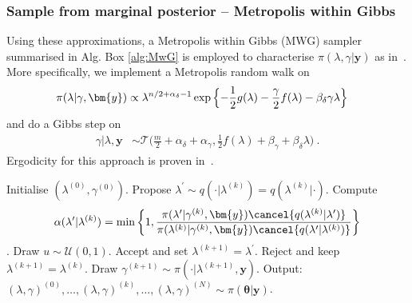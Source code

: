 \subsubsection{Sample from marginal posterior -- Metropolis within Gibbs}
\label{subsec:MWG}
Using these approximations, a Metropolis within Gibbs (MWG) sampler summarised in Alg. Box \ref{alg:MwG} is employed to characterise $\pi(\lambda,\gamma|\bm{y})$ as in~\cite{fox2016fast}.
More specifically, we implement a Metropolis random walk on
\begin{align}
	\label{eq:margApplCondGam}
	\pi(\lambda | \gamma, \bm{y}) &\propto \lambda^{n/2 +\alpha_{\delta}-1} \exp{\Bigl\{ - \frac{1}{2} g ( \lambda) - \frac{\gamma}{2} f ( \lambda) - \beta_\delta \gamma \lambda \Bigr\}}
\end{align} 
and do a Gibbs step on
\begin{align}
	\gamma |  \lambda, \bm{y} &\sim \mathcal{T}\bigg( \frac{m}{2} + \alpha_\delta + \alpha_\gamma, \frac{1}{2} f (\lambda) + \beta_\gamma + \beta_\delta \lambda \bigg)\label{eq:GibbsStep} \ .
\end{align} 
Ergodicity for this approach is proven in~\cite{roberts2006harris}.

\begin{algorithm}[!ht]
	\caption{Metropolis within Gibbs}
	\begin{algorithmic}[1]
		\STATE Initialise \( ( \lambda^{(0)} , \gamma^{(0)}  ) \).
		\STATE Propose \( \lambda^{\prime} \sim q(\cdot   | \lambda^{(k)}) = q(\lambda^{(k)} |\cdot  ) \).
		\STATE Compute
		\[ \alpha( \lambda^{\prime} | \lambda^{(k)}) = \min \left\{ 1, \frac{\pi(\lambda^{\prime}  | \gamma^{(k)}, \bm{y}) \cancel{q(\lambda^{(k)} | \lambda^{\prime} ) } }{\pi(\lambda^{(k)} | \gamma^{(k)}, \bm{y}) \cancel{q(\lambda^{\prime} | \lambda^{(k)})} } \right\} \].
		\STATE Draw $u \sim \mathcal{U}(0,1)$.
		\STATE Accept and set \( \lambda^{(k+1)} = \lambda^{\prime} \).
		\ELSE  
		\STATE Reject and keep \(\lambda^{(k+1)} = \lambda^{(k)} \).
		\ENDIF
		\STATE Draw \(\gamma^{(k+1)} \sim  \pi( \cdot | \lambda^{(k+1)} , \bm{y} )\).
		\ENDFOR
		\STATE Output: $ (\lambda,\gamma)^{(0)}, \dots,  (\lambda,\gamma)^{(k)} , \dots,   (\lambda,\gamma)^{(N)} \sim \pi(\bm{\theta}| \bm{y}) $.
	\end{algorithmic}
	\label{alg:MwG}
\end{algorithm}

